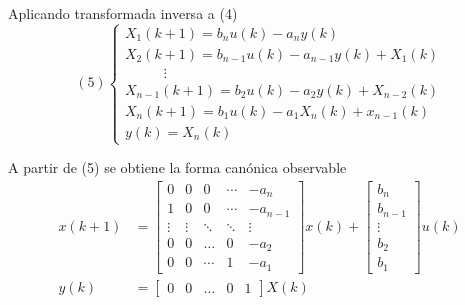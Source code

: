 Aplicando transformada inversa  a (4)
\[(5)
    \left\{
        \begin{array}{lll}
            X_{1}(k+1) = b_{n}u(k) - a_{n}y(k) \\ 
            X_{2}(k+1) = b_{n-1}u(k) - a_{n-1}y(k)+X_{1}(k) \\
            \;\;\;\;\;\;\;\;\;\; \vdots \\
            X_{n-1}(k+1) = b_{2}u(k) - a_{2}y(k) + X_{n-2}(k) \\
            X_{n}(k+1) = b_{1}u(k) - a_{1}X_{n}(k) + x_{n-1}(k) \\
            y(k) = X_{n}(k)
        \end{array}
    \right.
\]

A partir de (5) se obtiene la forma canónica observable
\[
    \begin{split}
        x(k+1) & = 
        \begin{bmatrix}
            0 & 0 & 0 & \cdots & -a_{n} \\
            1 & 0 & 0 & \cdots & -a_{n-1} \\
            \vdots & \vdots & \ddots & \ddots & \vdots \\
            0 & 0 & \ldots & 0 & -a_{2} \\
            0 & 0 & \cdots & 1 & -a_{1}
        \end{bmatrix}x(k) +
        \begin{bmatrix}
            b_{n} \\ b_{n-1} \\ \vdots \\ b_{2} \\ b_{1}
        \end{bmatrix}u(k) \\
        y(k) & = 
        \begin{bmatrix}
            0 & 0 & \ldots & 0 & 1    
        \end{bmatrix} X(k)
    \end{split}
\]